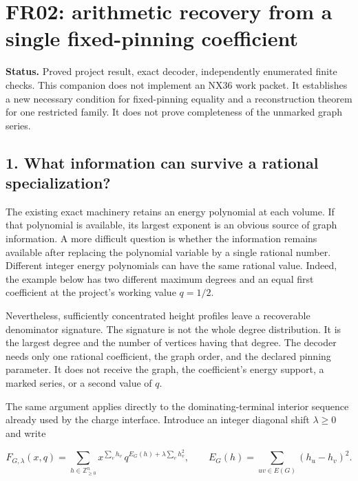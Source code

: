 \documentclass[
  11pt,
  a4paper,
]{report}
\begin{document}
\hypertarget{fr02-arithmetic-recovery-from-a-single-fixed-pinning-coefficient}{%
\chapter{FR02: arithmetic recovery from a single fixed-pinning
coefficient}\label{fr02-arithmetic-recovery-from-a-single-fixed-pinning-coefficient}}

\textbf{Status.} Proved project result, exact decoder, independently
enumerated finite checks. This companion does not implement an NX36 work
packet. It establishes a new necessary condition for fixed-pinning
equality and a reconstruction theorem for one restricted family. It does
not prove completeness of the unmarked graph series.

\hypertarget{what-information-can-survive-a-rational-specialization}{%
\section{1. What information can survive a rational
specialization?}\label{what-information-can-survive-a-rational-specialization}}

The existing exact machinery retains an energy polynomial at each
volume. If that polynomial is available, its largest exponent is an
obvious source of graph information. A more difficult question is
whether the information remains available after replacing the polynomial
variable by a single rational number. Different integer energy
polynomials can have the same rational value. Indeed, the example below
has two different maximum degrees and an equal first coefficient at the
project's working value \(q=1/2\).

Nevertheless, sufficiently concentrated height profiles leave a
recoverable denominator signature. The signature is not the whole degree
distribution. It is the largest degree and the number of vertices having
that degree. The decoder needs only one rational coefficient, the graph
order, and the declared pinning parameter. It does not receive the
graph, the coefficient's energy support, a marked series, or a second
value of \(q\).

The same argument applies directly to the dominating-terminal interior
sequence already used by the charge interface. Introduce an integer
diagonal shift \(\lambda\ge0\) and write

\[
F_{G,\lambda}(x,q)
 =\sum_{h\in\mathbb Z_{\ge0}^{n}}
 x^{\sum_vh_v}\,
 q^{E_G(h)+\lambda\sum_vh_v^2},
\qquad
E_G(h)=\sum_{uv\in E(G)}(h_u-h_v)^2.
\]
\end{document}
